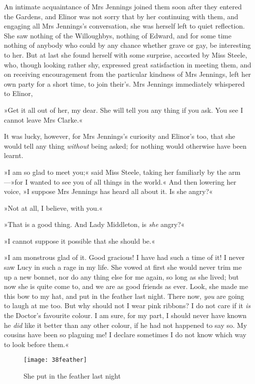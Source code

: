 An intimate acquaintance of Mrs Jennings joined them soon after they entered the Gardens, and Elinor was not sorry that by her continuing with them, and engaging all Mrs Jennings’s conversation, she was herself left to quiet reflection. She saw nothing of the Willoughbys, nothing of Edward, and for some time nothing of anybody who could by any chance whether grave or gay, be interesting to her. But at last she found herself with some surprise, accosted by Miss Steele, who, though looking rather shy, expressed great satisfaction in meeting them, and on receiving encouragement from the particular kindness of Mrs Jennings, left her own party for a short time, to join their’s. Mrs Jennings immediately whispered to Elinor,

»Get it all out of her, my dear. She will tell you any thing if you ask. You see I cannot leave Mrs Clarke.«

It was lucky, however, for Mrs Jennings’s curiosity and Elinor’s too, that she would tell any thing \textit{without} being asked; for nothing would otherwise have been learnt.

»I am so glad to meet you;« said Miss Steele, taking her familiarly by the arm—»for I wanted to see you of all things in the world.« And then lowering her voice, »I suppose Mrs Jennings has heard all about it. Is she angry?«

»Not at all, I believe, with you.«

»That is a good thing. And Lady Middleton, is \textit{she} angry?«

»I cannot suppose it possible that she should be.«

»I am monstrous glad of it. Good gracious! I have had such a time of it! I never saw Lucy in such a rage in my life. She vowed at first she would never trim me up a new bonnet, nor do any thing else for me again, so long as she lived; but now she is quite come to, and we are as good friends as ever. Look, she made me this bow to my hat, and put in the feather last night. There now, \textit{you} are going to laugh at me too. But why should not I wear pink ribbons? I do not care if it \textit{is} the Doctor’s favourite colour. I am sure, for my part, I should never have known he \textit{did} like it better than any other colour, if he had not happened to say so. My cousins have been so plaguing me! I declare sometimes I do not know which way to look before them.«


\begin{a4}
	\begin{figure}[tbph]
		\centering
		\texttt{[image: 38feather]}
		\caption{She put in the feather last night}
	\end{figure}
\end{a4}

